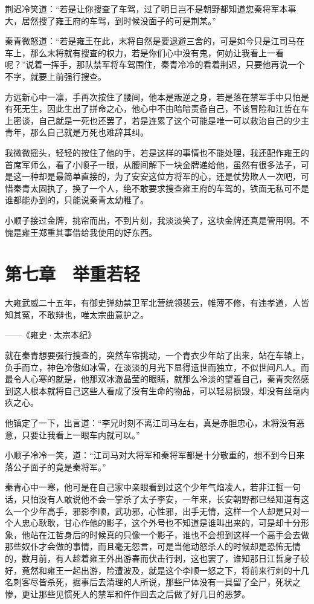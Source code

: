 荆迟冷笑道：“若是让你搜查了车驾，过了明日岂不是朝野都知道您秦将军本事大，居然搜了雍王府的车驾，到时候没面子的可是荆某。”

秦青微怒道：“若是雍王在此，末将自然是要退避三舍的，可是如今只是江司马在车上，那么末将就有搜查的权力，若是你们心中没有鬼，何妨让我看上一看呢？”说着一挥手，那队禁军将车驾围住，秦青冷冷的看着荆迟，只要他再说一个不字，就要上前强行搜查。

方远新心中一凛，手再次按住了腰间，他本是叛逆之身，若是落在禁军手中只怕是有死无生，因此生出了拼命之心，他心中不由暗暗责备自己，不该冒险和江哲在车上密谈，自己就是一死也还罢了，若是连累了这个可能是唯一可以救治自己的少主青年，那么自己就是万死也难辞其纠。

我微微摇头，轻轻的按住了他的手，若是这样的事情也不能处理，我还配作雍王的首席军师么，看了小顺子一眼，从腰间解下一块金牌递给他，虽然有很多法子，可是这一种却是最简单直接的，为了安安这位方将军的心，还是仗势欺人一次吧，可惜秦青太固执了，换了一个人，绝不敢要求搜查雍王府的车驾的，铁面无私可不是谁都能办到的，只能说秦青太幼稚了。

小顺子接过金牌，挑帘而出，不到片刻，我淡淡笑了，这块金牌还真是管用啊。不愧是雍王郑重其事借给我使用的好东西。

\chapter{第七章　举重若轻}

大雍武威二十五年，有御史弹劾禁卫军北营统领裴云，帷薄不修，有违孝道，人皆知其冤，不敢辩也，唯太宗曲意护之。

——《雍史·太宗本纪》

就在秦青想要强行搜查的，突然车帘挑动，一个青衣少年站了出来，站在车辕上，负手而立，神色冷傲如冰雪，在淡淡的月光下显得遗世而独立，不似世间凡人。而最令人心寒的就是，他那双冰澈晶莹的眼睛，就那么冷淡的望着自己，秦青突然感到这人根本就将自己这些人看成了没有生命的物品，可以轻易损毁，却没有丝毫内疚之心。

他镇定了一下，出言道：“李兄时刻不离江司马左右，真是赤胆忠心，末将没有恶意，只要让我看上一眼车内就可以。”

小顺子冷冷一笑，道：“江司马对大将军和秦将军都是十分敬重的，想不到今日来落公子面子的竟是秦将军。”

秦青心中一寒，他可是在自己家中亲眼看到过这个少年气焰凌人，若非江哲一句话，只怕没有人敢说他不会一掌杀了太子李安，一年来，长安朝野都已经知道有这么一个少年高手，邪影李顺，武功邪，心性邪，出手无情，这样一个人却是只对一个人忠心耿耿，甘心作他的影子，这个外号也不知道是谁叫出来的，可是却十分形象，他站在江哲身后的时候真的只像一个影子，谁也不会想到这样一个高手会去做那些奴仆才会做的事情，而且毫无怨言，可是当他动怒杀人的时候却是恐怖无情的，数月前，有人趁着雍王外出游春而伏击行刺，这也罢了，谁知那日江哲身子较好，竟然和雍王一起出游，险遭波及，就是这个李顺一怒之下，将前来行刺的十几名刺客尽皆杀死，据事后去清理的人所说，那些尸体没有一具留了全尸，死状之惨，更让那些见惯死人的禁军和仵作回去之后做了好几日的恶梦。

